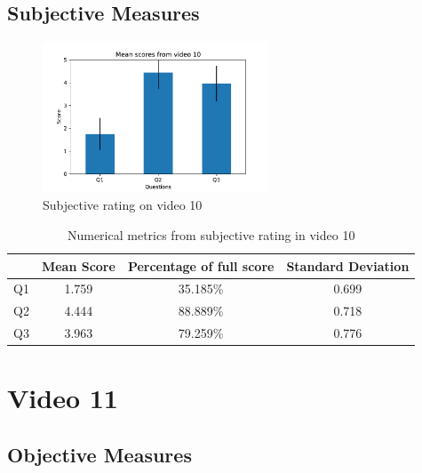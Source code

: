 \subsection{Subjective Measures}

\begin{figure}[H]
    \centering
    \includegraphics[width=0.6\textwidth]{img/subjective_measures/analysis/video_10.pdf}
    \caption{Subjective rating on video 10}
    \label{fig:visual_subj_vid10}
\end{figure}

\begin{table}[H]
    \centering
    \begin{tabular}{|c|c c c|} 
        \hline
           & \textbf{Mean Score} & \textbf{Percentage of full score} & \textbf{Standard Deviation} \\ [0.5ex] 
        \hline
        Q1 & 1.759 & 35.185\% & 0.699 \\ [1ex] 
        Q2 & 4.444 & 88.889\% & 0.718 \\ [1ex] 
        Q3 & 3.963 & 79.259\% & 0.776 \\ [1ex] 
        \hline
    \end{tabular}
    \caption{Numerical metrics from subjective rating in video 10}
    \label{tab:numerical_subj_vid10}
\end{table}



\section{Video 11}
\subsection{Objective Measures}

